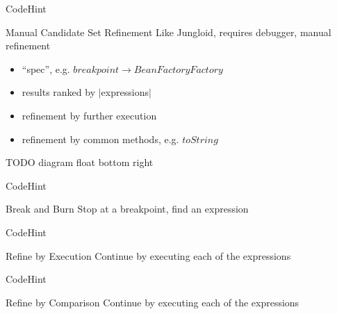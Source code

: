 \begin{frame}{CodeHint}
  \begin{block}{Manual Candidate Set Refinement}
    Like Jungloid, requires debugger, manual refinement

    \begin{itemize}
      \item ``spec'', e.g. $breakpoint \rightarrow BeanFactoryFactory$
      \item results ranked by $|$expressions$|$
      \item refinement by further execution
      \item refinement by common methods, e.g. $toString$
    \end{itemize}

    TODO diagram float bottom right
  \end{block}
\end{frame}

\begin{frame}{CodeHint}
  \begin{block}{Break and Burn}
    Stop at a breakpoint, find an expression

    \begin{example}
      
    \end{example}
  \end{block}
\end{frame}

\begin{frame}{CodeHint}
  \begin{block}{Refine by Execution}
    Continue by executing each of the expressions

    \begin{example}
      
    \end{example}
  \end{block}
\end{frame}

\begin{frame}{CodeHint}
  \begin{block}{Refine by Comparison}
    Continue by executing each of the expressions

    \begin{example}
      
    \end{example}
  \end{block}
\end{frame}

